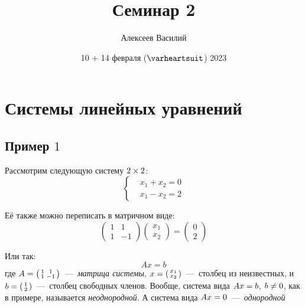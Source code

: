 \documentclass[a4paper,12pt]{article}
\author{Алексеев Василий}
\title{Семинар 2}
\date{10 + 14 февраля ($\heart$) 2023}
\begin{document}
  \maketitle
  
  \tableofcontents

  \thispagestyle{empty}
  
  \newpage
  


  \section{Системы линейных уравнений}

  \subsection{Пример $1$}

  Рассмотрим следующую систему $2 \hm\times 2$:
  \begin{equation}\label{eq:example-1-single-solution}
    \left\{ \begin{aligned}
      &x_1 + x_2 = 0\\
      &x_1 - x_2 = 2
    \end{aligned} \right.
  \end{equation}

  Её также можно переписать в матричном виде:
  \[
    \begin{pmatrix}
      1 & 1\\
      1 & -1
    \end{pmatrix} \begin{pmatrix}
      x_1 \\ x_2
    \end{pmatrix} = \begin{pmatrix}
      0 \\ 2
    \end{pmatrix}
  \]

  Или так:
  \[
    Ax = b
  \]
  где $A \hm= \left(\begin{smallmatrix}1 & 1\\1 & -1\end{smallmatrix}\right)$~---~\emph{матрица системы}, $x \hm= \left(\begin{smallmatrix}x_1 \\ x_2\end{smallmatrix}\right)$~---~столбец из неизвестных, и $b \hm= \left(\begin{smallmatrix}1 \\ 2\end{smallmatrix}\right)$~---~столбец свободных членов.
  Вообще, система вида $Ax \hm= b$, $b \hm{\not=} 0$, как в примере, называется \emph{неоднородной}.
  А система вида $Ax \hm= 0$~---~\emph{однородной}
\end{document}
